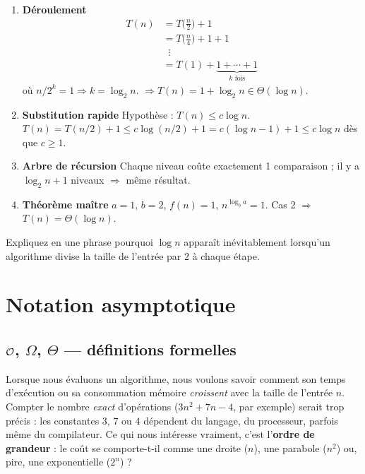 \begin{enumerate}[label=\alph*)]
  \item \textbf{Déroulement}
        \[
        \begin{aligned}
        T(n)&=T\!\bigl(\tfrac{n}{2}\bigr)+1\\
             &=T\!\bigl(\tfrac{n}{4}\bigr)+1+1\\
             &\;\;\vdots\\
             &=T(1)+\underbrace{1+\cdots+1}_{k\text{ fois}}
        \end{aligned}
        \]
        où \(n/2^{k}=1\Rightarrow k=\log_2 n\).
        \(\Rightarrow T(n)=1+\log_2 n\in\Theta(\log n).\)

  \item \textbf{Substitution rapide}
        Hypothèse : \(T(n)\le c\log n\).
        \(T(n)=T(n/2)+1\le c\log(n/2)+1
               =c(\log n-1)+1\le c\log n\) dès que \(c\ge1\).

  \item \textbf{Arbre de récursion}
        Chaque niveau coûte exactement 1 comparaison ; il y a
        \(\log_2 n+1\) niveaux $\Rightarrow$ même résultat.

  \item \textbf{Théorème maître}
        $a=1$, $b=2$, $f(n)=1$, \(n^{\log_b a}=1\).
        Cas 2 $\Rightarrow$ \(T(n)=\Theta(\log n)\).
\end{enumerate}

\begin{exercice}[Discussion]
Expliquez en une phrase pourquoi \(\log n\) apparaît inévitablement lorsqu’un
algorithme divise la taille de l’entrée par 2 à chaque étape.
\end{exercice}

\section{Notation asymptotique}

\subsection{$\mathcal{O}$, $\Omega$, $\Theta$ — définitions formelles}

Lorsque nous évaluons un algorithme, nous voulons savoir comment son
temps d’exécution ou sa consommation mémoire \emph{croissent} avec la taille
de l’entrée $n$.  Compter le nombre \emph{exact} d’opérations
($3n^{2}+7n-4$, par exemple) serait trop précis : les constantes $3$, $7$ ou
$4$ dépendent du langage, du processeur, parfois même du compilateur.
Ce qui nous intéresse vraiment, c’est l’\textbf{ordre de grandeur} :
le coût se comporte-t-il comme une droite ($n$), une parabole ($n^{2}$) ou,
pire, une exponentielle ($2^{n}$) ?

